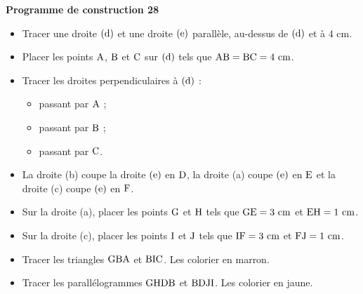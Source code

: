 \documentclass[exercice,a4]{thedocument}%
\begin{document}
%
\noindent\textbf{Programme de construction 28}\par\smallskip\noindent
\begin{itemize}
    \item Tracer une droite $(\text{d})$ et une droite
    $(\text{e})$ parallèle, au-dessus de $(\text{d})$ et à
    $4\text{ cm}$.
    \item Placer les points $\text{A}$, $\text{B}$ et
    $\text{C}$ sur $(\text{d})$ tels que
    $\text{AB}=\text{BC}=4\text{ cm}$.
    \item Tracer les droites perpendiculaires à $(\text{d})$ :
    \begin{itemize}
        \item[(a)] passant par $\text{A}$ ;
        \item[(b)] passant par $\text{B}$ ;
        \item[(c)] passant par $\text{C}$.
    \end{itemize}
    \item La droite (b) coupe la droite $(\text{e})$ en
    $\text{D}$, la droite (a) coupe $(\text{e})$ en
    $\text{E}$ et la droite (c) coupe $(\text{e})$ en
    $\text{F}$.
    \item Sur la droite (a), placer les points $\text{G}$ et
    $\text{H}$ tels que $\text{GE}=3\text{ cm}$ et
    $\text{EH}=1\text{ cm}$.
    \item Sur la droite (c), placer les points $\text{I}$ et
    $\text{J}$ tels que $\text{IF}=3\text{ cm}$ et
    $\text{FJ}=1\text{ cm}$.
    \item Tracer les triangles $\text{GBA}$ et $\text{BIC}$.
    Les colorier en marron.
    \item Tracer les parallélogrammes $\text{GHDB}$ et
    $\text{BDJI}$. Les colorier en jaune.
\end{itemize}
\end{document}

